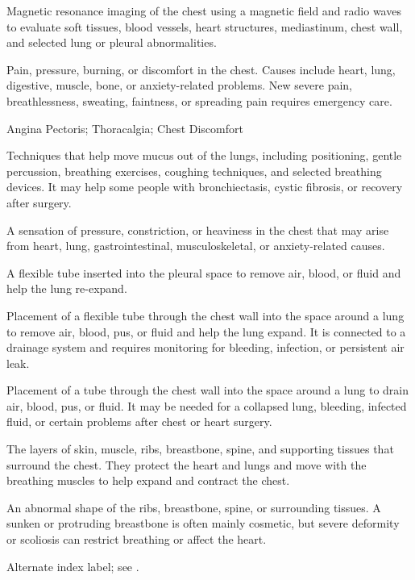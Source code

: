  Magnetic resonance imaging of the chest using a magnetic field and radio waves to evaluate soft tissues, blood vessels, heart structures, mediastinum, chest wall, and selected lung or pleural abnormalities.

 Pain, pressure, burning, or discomfort in the chest. Causes include heart, lung, digestive, muscle, bone, or anxiety-related problems. New severe pain, breathlessness, sweating, faintness, or spreading pain requires emergency care.

\synonyms
Angina Pectoris; Thoracalgia; Chest Discomfort

 Techniques that help move mucus out of the lungs, including positioning, gentle percussion, breathing exercises, coughing techniques, and selected breathing devices. It may help some people with bronchiectasis, cystic fibrosis, or recovery after surgery.

 A sensation of pressure, constriction, or heaviness in the chest that may arise from heart, lung, gastrointestinal, musculoskeletal, or anxiety-related causes.

 A flexible tube inserted into the pleural space to remove air, blood, or fluid and help the lung re-expand.

 Placement of a flexible tube through the chest wall into the space around a lung to remove air, blood, pus, or fluid and help the lung expand. It is connected to a drainage system and requires monitoring for bleeding, infection, or persistent air leak.

 Placement of a tube through the chest wall into the space around a lung to drain air, blood, pus, or fluid. It may be needed for a collapsed lung, bleeding, infected fluid, or certain problems after chest or heart surgery.

 The layers of skin, muscle, ribs, breastbone, spine, and supporting tissues that surround the chest. They protect the heart and lungs and move with the breathing muscles to help expand and contract the chest.

 An abnormal shape of the ribs, breastbone, spine, or surrounding tissues. A sunken or protruding breastbone is often mainly cosmetic, but severe deformity or scoliosis can restrict breathing or affect the heart.

 Alternate index label; see .


